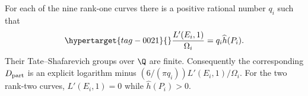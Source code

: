 \begin{proposition}\hypertarget{tag-0012}{}\label{ari:C.6.R3}

For each of the nine rank-one curves there is a positive rational
number $q_i$ such that
\begin{equation}\hypertarget{tag-0021}{}\label{ari:eq:Cr-rational-factor}
 \frac{L'(E_i,1)}{\Omega_i}=q_i\widehat h(P_i).
\end{equation}
Their Tate--Shafarevich groups over $\Q$ are finite. Consequently
the corresponding $D_{\rm part}$ is an explicit logarithm minus
$(6/(\pi q_i))L'(E_i,1)/\Omega_i$. For the two rank-two curves, $L'(E_i,1)=0$ while
$\widehat h(P_i)>0$.
\end{proposition}


